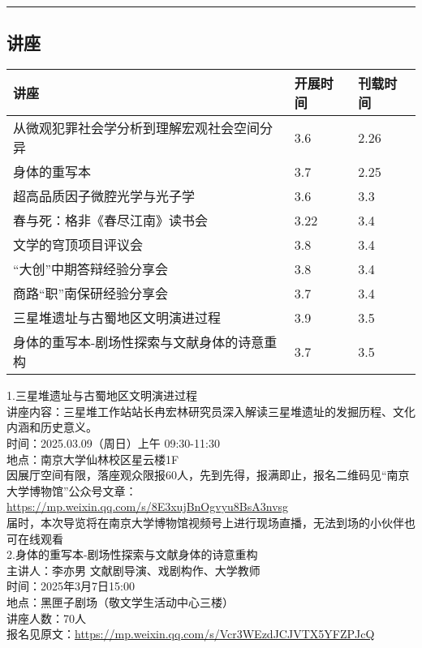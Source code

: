\documentclass[letterpaper, 12pt]{article}
\begin{document}
\hrule
\pagebreak
\begin{multicols}{2}

\section{讲座}
\begin{tabular}{|>{\centering\arraybackslash}m{}|m{}|m{}|}
    \hline
    讲座 & 开展时间 & 刊载时间\\
    \hline\hline
    从微观犯罪社会学分析到理解宏观社会空间分异   &3.6  &2.26 \\\hline
    身体的重写本 & 3.7 & 2.25\\\hline
    超高品质因子微腔光学与光子学 & 3.6 & 3.3\\\hline
    春与死：格非《春尽江南》读书会 & 3.22 & 3.4\\\hline
    文学的穹顶项目评议会 & 3.8 & 3.4\\\hline
    “大创”中期答辩经验分享会 & 3.8 & 3.4\\\hline
    商路“职”南保研经验分享会 & 3.7 & 3.4\\\hline
    三星堆遗址与古蜀地区文明演进过程 & 3.9 & 3.5\\\hline
    身体的重写本-剧场性探索与文献身体的诗意重构 & 3.7 & 3.5\\\hline
\end{tabular}
1.三星堆遗址与古蜀地区文明演进过程\\
讲座内容：三星堆工作站站长冉宏林研究员深入解读三星堆遗址的发掘历程、文化内涵和历史意义。\\
时间：2025.03.09（周日）上午 09:30-11:30\\
地点：南京大学仙林校区星云楼1F\\
因展厅空间有限，落座观众限报60人，先到先得，报满即止，报名二维码见“南京大学博物馆”公众号文章：\url{https://mp.weixin.qq.com/s/8E3xujBnOgvyu8BsA3nvsg}\\
届时，本次导览将在南京大学博物馆视频号上进行现场直播，无法到场的小伙伴也可在线观看\\
2.身体的重写本-剧场性探索与文献身体的诗意重构\\
主讲人：李亦男 文献剧导演、戏剧构作、大学教师\\
时间：2025年3月7日15:00\\
地点：黑匣子剧场（敬文学生活动中心三楼）\\
讲座人数：70人\\
报名见原文：\url{https://mp.weixin.qq.com/s/Vcr3WEzdJCJVTX5YFZPJcQ}\\





\end{multicols}
\end{document}

